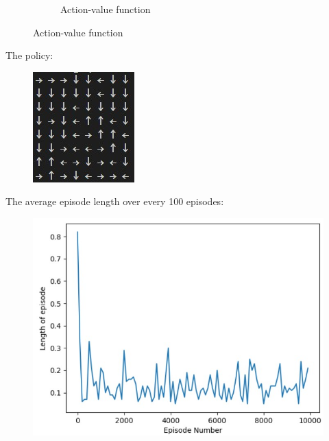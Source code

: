\documentclass{article}
\begin{document}
\begin{enumerate}
\begin{figure}[H]
\begin{subfigure}[b]{0.5\linewidth}
		\caption{Action-value function}
	\end{subfigure}
\end{figure}
The policy:
\begin{figure}[H]
	\centering
	\includegraphics{QPolicy3.jpg}
\end{figure}
The average episode length over every 100 episodes:
\begin{figure}[H]
	\centering
	\includegraphics[scale = 0.5]{QPlot3.jpg}
\end{figure}
\end{enumerate}
\end{document}

